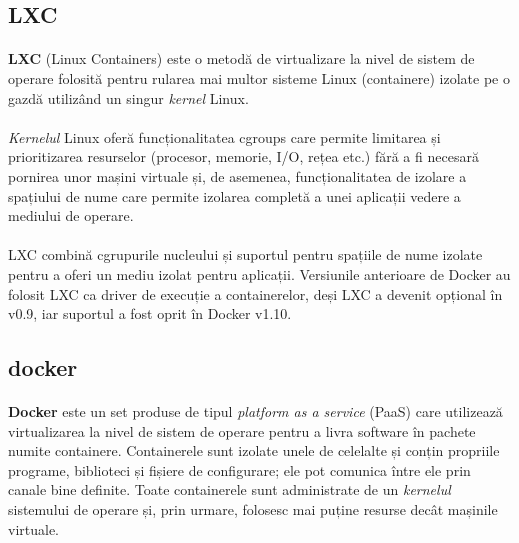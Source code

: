     \subsection{LXC}
        \paragraph{} \textbf{LXC} (Linux Containers) este o metodă de virtualizare la nivel de sistem de operare folosită pentru rularea mai multor sisteme Linux (containere) izolate pe o gazdă utilizând un singur \textit{kernel} Linux. \cite{wiki:lxc}
        \paragraph{} \textit{Kernelul} Linux oferă funcționalitatea cgroups care permite limitarea și prioritizarea resurselor (procesor, memorie, I/O, rețea etc.) fără a fi necesară pornirea unor mașini virtuale și, de asemenea, funcționalitatea de izolare a spațiului de nume care permite izolarea completă a unei aplicații vedere a mediului de operare. \cite{wiki:lxc}
        \paragraph{} LXC combină cgrupurile nucleului și suportul pentru spațiile de nume izolate pentru a oferi un mediu izolat pentru aplicații. Versiunile anterioare de Docker au folosit LXC ca driver de execuție a containerelor, deși LXC a devenit opțional în v0.9, iar suportul a fost oprit în Docker v1.10. \cite{lxc_docker}\cite{wiki:lxc}

    \subsection{docker}
        \paragraph{} \textbf{Docker} este un set produse de tipul \textit{platform as a service} (PaaS) care utilizează virtualizarea la nivel de sistem de operare pentru a livra software în pachete numite containere. Containerele sunt izolate unele de celelalte și conțin propriile programe, biblioteci și fișiere de configurare; ele pot comunica între ele prin canale bine definite. Toate containerele sunt administrate de un \textit{kernelul} sistemului de operare și, prin urmare, folosesc mai puține resurse decât mașinile virtuale. \cite{wiki:docker}

